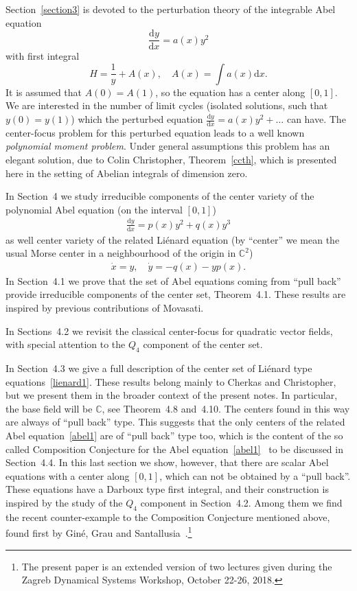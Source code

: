 \documentclass[11pt]{article}
\theoremstyle{definition}
\numberwithin{equation}{section}
\numberwithin{figure}{section}
\numberwithin{table}{section}
\newcommand*{\dd}{\mathrm{d}}
\newcommand*{\dx}{\dd x}
\newcommand*{\dy}{\dd y}
\newcommand{\Cbb}{\mathbb C}
\begin{document}
Section~\ref{section3} is devoted to the perturbation theory of the integrable Abel equation
\[
\frac{\dy}{\dx} = a(x) y^2
\]
with first integral
\[
H= \frac1y + A(x),\quad A(x)= \int a(x) \dx.
\]
It is assumed that $A(0)=A(1)$, so the equation has a center along $[0,1]$. We are interested in the number of limit cycles (isolated solutions, such that $y(0)=y(1)$) which the perturbed equation $
\frac{\dy}{\dx} = a(x) y^2 + \dots $ can have. The center-focus problem for this perturbed equation leads to a well known \emph{ polynomial moment problem}. Under general assumptions this problem has an elegant solution, due to Colin Christopher, Theorem~\ref{ccth}, which is presented here in the setting of Abelian integrals of dimension zero.

In Section~4 we study irreducible components of the center variety of the polynomial Abel equation (on the interval $[0,1]$)
\begin{align}\label{abel1}
\frac{\dy}{\dx} = p(x) y^2 + q(x) y^3
\end{align}
as well center variety of the related Liénard equation (by ``center'' we mean the usual Morse center in a neighbourhood of the origin in $\mathbb C^2$)
\begin{align}\label{lienard1}
\dot{x} = y, \quad \dot{y} = -q(x) - y p(x).
\end{align}
In Section~4.1 we prove that the set of Abel equations coming from ``pull back'' provide irreducible components of the center set, Theorem~4.1. These results are inspired by previous contributions of Movasati.

In Sections~4.2 we revisit the classical center-focus for quadratic vector fields, with special attention to the $Q_4$ component of the center set.

In Section~4.3 we give a full description of the center set of Liénard type equations~\eqref{lienard1}. These results belong mainly to Cherkas and Christopher, but we present them in the broader context of the present notes. In particular, the base field will be $\Cbb$, see Theorem~4.8 and~4.10. The centers found in this way are always of ``pull back'' type. This suggests that the only centers of the related Abel equation~\eqref{abel1} are of ``pull back'' type too, which is the content of the so called Composition Conjecture for the Abel equation~\eqref{abel1}~\cite[p.~444]{bry10} to be discussed in Section~4.4. In this last section we show, however, that there are scalar Abel equations with a center along $[0,1]$, which can not be obtained by a ``pull back''. These equations have a Darboux type first integral, and their construction is inspired by the study of the $Q_4$ component in Section~4.2. Among them we find the recent counter-example to the Composition Conjecture mentioned above, found first by Giné, Grau and Santallusia~\cite{ggs18}.\footnote{\label{myfootnote}
The present paper is an extended version of two lectures given during the Zagreb Dynamical Systems Workshop, October 22-26, 2018.}%
\end{document}
